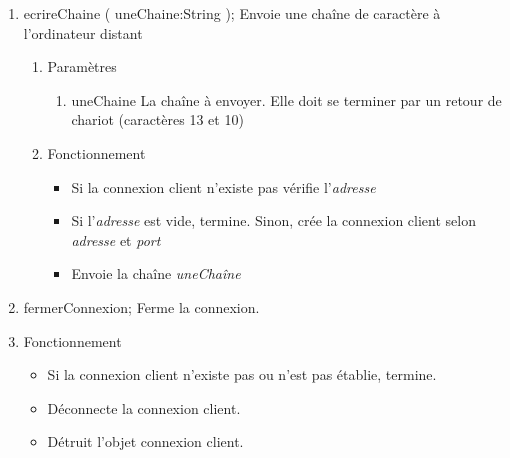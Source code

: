 \documentclass[12pt,pdftex,oneside]{uqam_these}
\begin{document}
\begin{enumerate}
\begin{enumerate}
\begin{enumerate}
        \end{enumerate}

  \item ecrireChaine ( uneChaine:String );
        Envoie une chaîne de caractère à l'ordinateur distant
        \begin{enumerate}
        \item Paramètres
          \begin{enumerate}
          \item uneChaine
                La chaîne à envoyer. Elle doit se terminer par un retour de chariot (caractères 13 et 10)
          \end{enumerate}
        \item Fonctionnement
          \begin{itemize}
            \item Si la connexion client n'existe pas vérifie
              l'\emph{adresse}
            \item Si l'\emph{adresse} est vide, termine. Sinon, crée
              la connexion client selon \emph{adresse} et \emph{port}
            \item Envoie la chaîne \emph{uneChaîne}
          \end{itemize}
        \end{enumerate}

  \item fermerConnexion;
        Ferme la connexion.
        \item Fonctionnement
          \begin{itemize}
            \item Si la connexion client n'existe pas ou n'est pas
              établie, termine.
            \item Déconnecte la connexion client.
            \item Détruit l'objet connexion client.
          \end{itemize}
  \end{enumerate}
\end{enumerate}
\end{document}
